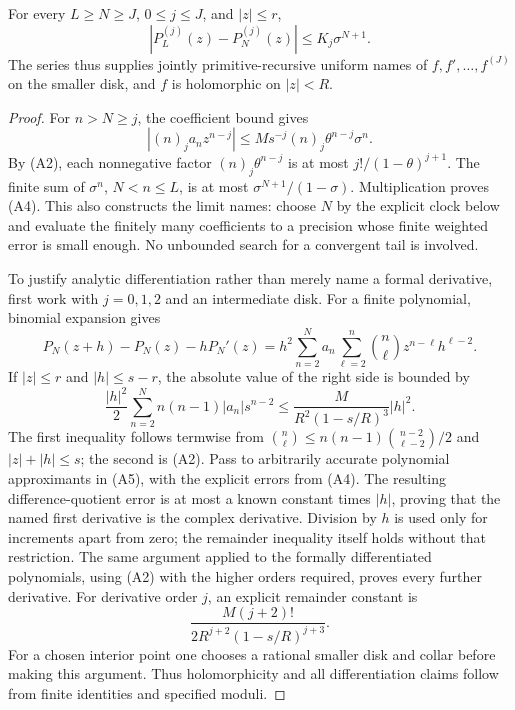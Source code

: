 \begin{theorem}
\label{thm:analytic-tail}
For every \(L\geq N\geq J\), \(0\leq j\leq J\), and \(|z|\leq r\),
\[
          |P_L^{(j)}(z)-P_N^{(j)}(z)|
                          \leq K_j\sigma^{N+1}.
\tag{A4}
\]
The series thus supplies jointly primitive-recursive uniform names of
\(f,f',\ldots,f^{(J)}\) on the smaller disk, and \(f\) is holomorphic on
\(|z|<R\).
\end{theorem}
\begin{proof}
For \(n>N\geq j\), the coefficient bound gives
\[
 |(n)_ja_nz^{n-j}|
 \leq M s^{-j}(n)_j\theta^{n-j}\sigma^n.
\]
By (A2), each nonnegative factor
\((n)_j\theta^{n-j}\) is at most
\(j!/(1-\theta)^{j+1}\).
The finite sum of \(\sigma^n\), \(N<n\leq L\), is at most
\(\sigma^{N+1}/(1-\sigma)\).
Multiplication proves (A4). This also constructs the limit names:
choose \(N\) by the explicit clock below and evaluate the finitely many
coefficients to a precision whose finite weighted error is small enough.
No unbounded search for a convergent tail is involved.

To justify analytic differentiation rather than merely name a formal
derivative, first work with \(j=0,1,2\) and an intermediate disk.
For a finite polynomial, binomial expansion gives
\[
P_N(z+h)-P_N(z)-hP_N'(z)
 =h^2\sum_{n=2}^N a_n
               \sum_{\ell=2}^n\binom n\ell z^{n-\ell}h^{\ell-2}.
\]
If \(|z|\leq r\) and \(|h|\leq s-r\), the absolute value of the right side
is bounded by
\[
\frac{|h|^2}{2}\sum_{n=2}^N n(n-1)|a_n|s^{n-2}
 \leq \frac{M}{R^2(1-s/R)^3}|h|^2 .
\tag{A5}
\]
The first inequality follows termwise from
\(\binom n\ell\leq n(n-1)\binom{n-2}{\ell-2}/2\)
and \(|z|+|h|\leq s\); the second is (A2).
Pass to arbitrarily accurate polynomial approximants in (A5), with the
explicit errors from (A4). The resulting difference-quotient error is at
most a known constant times \(|h|\), proving that the named first
derivative is the complex derivative. Division by \(h\) is used only for
increments apart from zero; the remainder inequality itself holds without
that restriction.
The same argument applied to the formally differentiated polynomials,
using (A2) with the higher orders required, proves every further
derivative. For derivative order \(j\), an explicit remainder constant is
\[
             \frac{M(j+2)!}{2R^{j+2}(1-s/R)^{j+3}}.
\]
For a chosen interior point one chooses a rational smaller disk
and collar before making this argument. Thus holomorphicity and all
differentiation claims follow from finite identities and specified moduli.
\end{proof}


